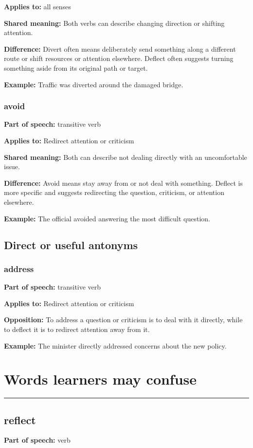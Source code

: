\documentclass[11pt]{article}
\newcommand{\sectionrule}{\par\vspace{-0.5em}\noindent\textcolor{Accent}{\rule{\linewidth}{0.6pt}}\par}
\begin{document}
\textbf{Applies to:} all senses

\textbf{Shared meaning:} Both verbs can describe changing direction or shifting attention.

\textbf{Difference:} Divert often means deliberately send something along a different route or shift resources or attention elsewhere. Deflect often suggests turning something aside from its original path or target.

\textbf{Example:} Traffic was diverted around the damaged bridge.

\subsubsection{avoid}
\textbf{Part of speech:} transitive verb

\textbf{Applies to:} Redirect attention or criticism

\textbf{Shared meaning:} Both can describe not dealing directly with an uncomfortable issue.

\textbf{Difference:} Avoid means stay away from or not deal with something. Deflect is more specific and suggests redirecting the question, criticism, or attention elsewhere.

\textbf{Example:} The official avoided answering the most difficult question.

\subsection{Direct or useful antonyms}
\subsubsection{address}
\textbf{Part of speech:} transitive verb

\textbf{Applies to:} Redirect attention or criticism

\textbf{Opposition:} To address a question or criticism is to deal with it directly, while to deflect it is to redirect attention away from it.

\textbf{Example:} The minister directly addressed concerns about the new policy.

\section{Words learners may confuse}
\sectionrule
\subsection{reflect}
\textbf{Part of speech:} verb
\end{document}
